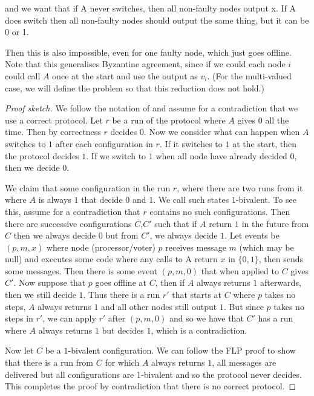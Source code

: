 \documentclass{article}
\begin{document}
and we want that if A never switches, then all non-faulty nodes output x. If A does switch then all non-faulty nodes should output the same thing, but it can be 0 or 1. 

Then this is also impossible, even for one faulty node, which just goes offline. Note that this generalises Byzantine agreement, since if we could each node $i$ could call $A$ once at the start and use the output as $v_i$. (For the multi-valued case, we will define the problem so that this reduction does not hold.)


\begin{proof}[Proof sketch] We follow the notation of  \cite{flp} and assume for a contradiction that we use a correct protocol. 
Let $r$ be a run of the protocol where $A$ gives $0$ all the time.
Then by correctness $r$ decides $0$. Now we consider what can happen when $A$ switches to $1$ after each configuration in $r$. If it switches to $1$ at the start, then the protocol decides $1$.
If we switch to $1$ when all node have already decided $0$, then we decide $0$.

We claim that some configuration in the run $r$, where there are two runs from it where $A$ is always $1$ that decide $0$ and $1$. We call such states $1$-bivalent.
To see this, assume for a contradiction that $r$ contains no such configurations. Then there are successive configurations $C$,$C'$ such that if $A$ return $1$ in the future from $C$ then we always decide $0$ but from $C'$, we always decide $1$.
Let events be $(p,m,x)$ where node (processor/voter) $p$ receives message $m$ (which may be null) and executes some code where any calls to A return $x$ in $\{0,1\}$, then sends some messages. 
Then there is some event $(p,m,0)$ that when applied to $C$ gives $C'$. Now suppose that $p$ goes offline at $C$, then if $A$ always returns $1$ afterwards, then we still decide $1$. Thus there is a run $r'$ that starts at $C$ where $p$ takes no steps, $A$ always returns $1$ and all other nodes still output $1$.
But since $p$ takes no steps in $r'$, we can apply $r'$ after $(p, m, 0)$ and so we have that $C'$ has a run where $A$ always returns $1$ but decides $1$, which is a contradiction.

Now let $C$ be a $1$-bivalent configuration. We can follow the FLP proof to show that there is a run from $C$ for which $A$ always returns $1$, all messages are delivered but all configurations are 1-bivalent and so the protocol never decides. This completes the proof by contradiction that there is no correct protocol.
\end{proof}
\end{document}
